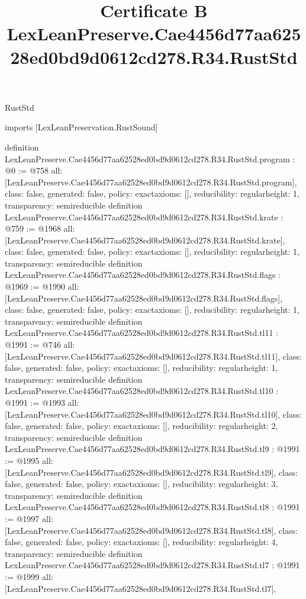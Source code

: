 \begin{lexlean}{RustStd}
\title{Certificate B LexLeanPreserve.Cae4456d77aa62528ed0bd9d0612cd278.R34.RustStd}
\begin{coremodule}
imports [LexLeanPreservation.RustSound]

definition LexLeanPreserve.Cae4456d77aa62528ed0bd9d0612cd278.R34.RustStd.program : @0 := @758 {
  all: [LexLeanPreserve.Cae4456d77aa62528ed0bd9d0612cd278.R34.RustStd.program],
  class: false,
  generated: false,
  policy: exact{axioms: []},
  reducibility: regular{height: 1},
  transparency: semireducible
}
definition LexLeanPreserve.Cae4456d77aa62528ed0bd9d0612cd278.R34.RustStd.krate : @759 := @1968 {
  all: [LexLeanPreserve.Cae4456d77aa62528ed0bd9d0612cd278.R34.RustStd.krate],
  class: false,
  generated: false,
  policy: exact{axioms: []},
  reducibility: regular{height: 1},
  transparency: semireducible
}
definition LexLeanPreserve.Cae4456d77aa62528ed0bd9d0612cd278.R34.RustStd.flags : @1969 := @1990 {
  all: [LexLeanPreserve.Cae4456d77aa62528ed0bd9d0612cd278.R34.RustStd.flags],
  class: false,
  generated: false,
  policy: exact{axioms: []},
  reducibility: regular{height: 1},
  transparency: semireducible
}
definition LexLeanPreserve.Cae4456d77aa62528ed0bd9d0612cd278.R34.RustStd.tl11 : @1991 := @746 {
  all: [LexLeanPreserve.Cae4456d77aa62528ed0bd9d0612cd278.R34.RustStd.tl11],
  class: false,
  generated: false,
  policy: exact{axioms: []},
  reducibility: regular{height: 1},
  transparency: semireducible
}
definition LexLeanPreserve.Cae4456d77aa62528ed0bd9d0612cd278.R34.RustStd.tl10 : @1991 := @1993 {
  all: [LexLeanPreserve.Cae4456d77aa62528ed0bd9d0612cd278.R34.RustStd.tl10],
  class: false,
  generated: false,
  policy: exact{axioms: []},
  reducibility: regular{height: 2},
  transparency: semireducible
}
definition LexLeanPreserve.Cae4456d77aa62528ed0bd9d0612cd278.R34.RustStd.tl9 : @1991 := @1995 {
  all: [LexLeanPreserve.Cae4456d77aa62528ed0bd9d0612cd278.R34.RustStd.tl9],
  class: false,
  generated: false,
  policy: exact{axioms: []},
  reducibility: regular{height: 3},
  transparency: semireducible
}
definition LexLeanPreserve.Cae4456d77aa62528ed0bd9d0612cd278.R34.RustStd.tl8 : @1991 := @1997 {
  all: [LexLeanPreserve.Cae4456d77aa62528ed0bd9d0612cd278.R34.RustStd.tl8],
  class: false,
  generated: false,
  policy: exact{axioms: []},
  reducibility: regular{height: 4},
  transparency: semireducible
}
definition LexLeanPreserve.Cae4456d77aa62528ed0bd9d0612cd278.R34.RustStd.tl7 : @1991 := @1999 {
  all: [LexLeanPreserve.Cae4456d77aa62528ed0bd9d0612cd278.R34.RustStd.tl7],
}
\end{coremodule}
\end{lexlean}
